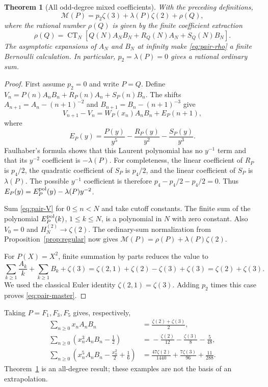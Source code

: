 \documentclass[11pt,letterpaper]{article}
\numberwithin{equation}{section}
\newtheorem{theorem}{Theorem}[section]
\theoremstyle{definition}\newtheorem{definition}[theorem]{Definition}
\theoremstyle{remark}\newtheorem{remark}[theorem]{Remark}
\DeclareMathOperator{\CT}{CT}
\begin{document}
\begin{theorem}[All odd-degree mixed coefficients]\label{thm:pair}
With the preceding definitions,
\begin{equation}\label{eq:pair-master}
 \boxed{\mathscr M(P)=p_2\zeta(3)+\lambda(P)\zeta(2)+\rho(Q),}
\end{equation}
where the rational number $\rho(Q)$ is given by the finite
coefficient extraction
\begin{equation}\label{eq:pair-rho}
 \rho(Q)=\CT_N\left[
 Q(N)A_NB_N+R_Q(N)A_N+S_Q(N)B_N\right].
\end{equation}
The asymptotic expansions of $A_N$ and $B_N$ at infinity make
\eqref{eq:pair-rho} a finite Bernoulli calculation.
In particular, $p_2=\lambda(P)=0$ gives a rational ordinary sum.
\end{theorem}

\begin{proof}
First assume $p_2=0$ and write $P=Q$. Define
$V_n=P(n)A_nB_n+R_P(n)A_n+S_P(n)B_n$.
The shifts $A_{n+1}=A_n-(n+1)^{-2}$ and
$B_{n+1}=B_n-(n+1)^{-3}$ give
\begin{equation}\label{eq:pair-V}
 V_{n+1}-V_n=W_P(x_n)A_nB_n+E_P(n+1),
\end{equation}
where
\[
 E_P(y)=\frac{P(y)}{y^5}-\frac{R_P(y)}{y^2}-\frac{S_P(y)}{y^3}.
\]
Faulhaber's formula shows that this Laurent polynomial has no
$y^{-1}$ term and that its $y^{-2}$ coefficient is $-\lambda(P)$.
For completeness, the linear coefficient of $R_P$ is $p_4/2$,
the quadratic coefficient of $S_P$ is $p_4/2$, and the linear
coefficient of $S_P$ is $\lambda(P)$. The possible $y^{-1}$
coefficient is therefore $p_4-p_4/2-p_4/2=0$.
Thus $E_P(y)=E_P^{\rm pol}(y)-\lambda(P)y^{-2}$.

Sum \eqref{eq:pair-V} for $0\le n<N$ and take cutoff constants.
The finite sum of the polynomial $E_P^{\rm pol}(k)$, $1\le k\le N$,
is a polynomial in $N$ with zero constant. Also $V_0=0$ and
$H_N^{(2)}\to\zeta(2)$. The ordinary-sum normalization from
Proposition~\ref{prop:regular} now gives
$\mathscr M(P)=\rho(P)+\lambda(P)\zeta(2)$.

For $P(X)=X^2$, finite summation by parts reduces the value to
\[
 \sum_{k\ge1}\frac{A_k}{k}+\sum_{k\ge1}B_k+\zeta(3)
 =\zeta(2,1)+\zeta(2)-\zeta(3)+\zeta(3)
 =\zeta(2)+\zeta(3).
\]
We used the classical Euler identity $\zeta(2,1)=\zeta(3)$.
Adding $p_2$ times this case proves \eqref{eq:pair-master}.
\end{proof}

Taking $P=F_1,F_3,F_5$ gives, respectively,
\begin{align}
 \sum_{n\ge0}x_nA_nB_n
   &={}\frac{\zeta(2)+\zeta(3)}2,\label{eq:pair1}\\
 \sum_{n\ge0}\left(x_n^3A_nB_n-\frac12\right)
   &={}-\frac{\zeta(2)}{12}-\frac{\zeta(3)}8-\frac5{48},\label{eq:pair3}\\
 \sum_{n\ge0}\left(x_n^5A_nB_n-\frac{x_n^2}{2}+\frac16\right)
   &={}\frac{47\zeta(2)}{1440}+\frac{7\zeta(3)}{96}+\frac{11}{288}.
 \label{eq:pair5}
\end{align}
Theorem~\ref{thm:pair} is an all-degree result; these examples are
not the basis of an extrapolation.
\end{document}
